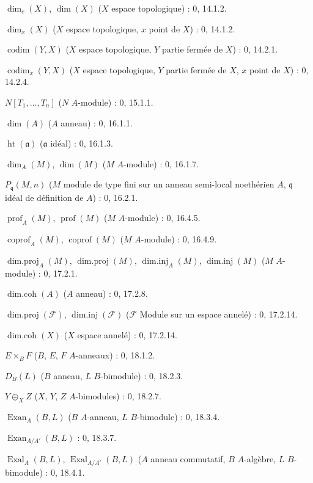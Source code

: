 \documentclass[10pt,oneside]{book}
\begin{document}
$\dim_c(X)$, $\dim(X)$ ($X$ espace topologique) : 0, 14.1.2.\par
$\dim_x(X)$ ($X$ espace topologique, $x$ point de $X$) : 0, 14.1.2.\par
$\operatorname{codim}(Y,X)$ ($X$ espace topologique, $Y$ partie fermée de $X$) : 0, 14.2.1.\par
$\operatorname{codim}_x(Y,X)$ ($X$ espace topologique, $Y$ partie fermée de $X$, $x$ point de $X$) : 0, 14.2.4.\par
$N[T_1,\ldots,T_n]$ ($N$ $A$-module) : 0, 15.1.1.\par
$\dim(A)$ ($A$ anneau) : 0, 16.1.1.\par
$\operatorname{ht}(\mathfrak a)$ ($\mathfrak a$ idéal) : 0, 16.1.3.\par
$\dim_A(M)$, $\dim(M)$ ($M$ $A$-module) : 0, 16.1.7.\par
$P_{\mathfrak q}(M,n)$ ($M$ module de type fini sur un anneau semi-local noethérien $A$, $\mathfrak q$ idéal de définition de $A$) : 0, 16.2.1.\par
$\operatorname{prof}_A(M)$, $\operatorname{prof}(M)$ ($M$ $A$-module) : 0, 16.4.5.\par
$\operatorname{coprof}_A(M)$, $\operatorname{coprof}(M)$ ($M$ $A$-module) : 0, 16.4.9.\par
$\operatorname{dim.proj}_A(M)$, $\operatorname{dim.proj}(M)$,
$\operatorname{dim.inj}_A(M)$, $\operatorname{dim.inj}(M)$ ($M$ $A$-module) : 0, 17.2.1.\par
$\operatorname{dim.coh}(A)$ ($A$ anneau) : 0, 17.2.8.\par
$\operatorname{dim.proj}(\mathscr F)$, $\operatorname{dim.inj}(\mathscr F)$
($\mathscr F$ Module sur un espace annelé) : 0, 17.2.14.\par
$\operatorname{dim.coh}(X)$ ($X$ espace annelé) : 0, 17.2.14.\par
$E\times_B F$ ($B$, $E$, $F$ $A$-anneaux) : 0, 18.1.2.\par
$D_B(L)$ ($B$ anneau, $L$ $B$-bimodule) : 0, 18.2.3.\par
$Y\oplus_X Z$ ($X$, $Y$, $Z$ $A$-bimodules) : 0, 18.2.7.\par
$\operatorname{Exan}_A(B,L)$ ($B$ $A$-anneau, $L$ $B$-bimodule) : 0, 18.3.4.\par
$\operatorname{Exan}_{A/A'}(B,L)$ : 0, 18.3.7.\par
$\operatorname{Exal}_A(B,L)$, $\operatorname{Exal}_{A/A'}(B,L)$ ($A$ anneau commutatif, $B$ $A$-algèbre, $L$ $B$-bimodule) : 0, 18.4.1.\par
\end{document}
